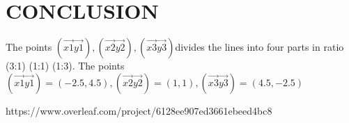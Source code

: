 \documentclass[12pt,a4paper,twoside]{article}
\begin{document}
\section{CONCLUSION}

The points $(\vec{x1} \vec{y1}), (\vec{x2} \vec{y2}), (\vec{x3} \vec{y3})$divides the lines into four parts in ratio (3:1) (1:1) (1:3).
The points  $(\vec{x1}  \vec{y1})=(-2.5,4.5), ( \vec{x2} \vec{y2})=(1,1), ( \vec{x3} \vec{y3})=(4.5,-2.5)$

https://www.overleaf.com/project/6128ee907ed3661ebeed4bc8
\end{document}
